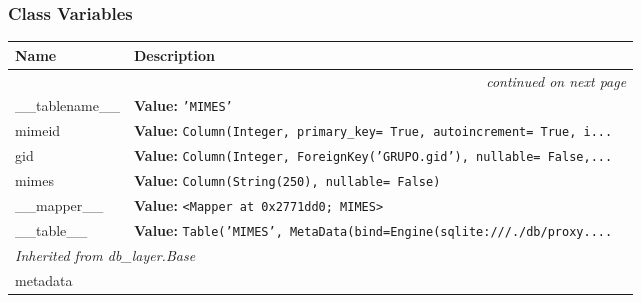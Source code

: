 
  \subsubsection{Class Variables}

    \vspace{-1cm}
\hspace{\varindent}\begin{longtable}{|p{\varnamewidth}|p{\vardescrwidth}|l}
\cline{1-2}
\cline{1-2} \centering \textbf{Name} & \centering \textbf{Description}& \\
\cline{1-2}
\endhead\cline{1-2}\multicolumn{3}{r}{\small\textit{continued on next page}}\\\endfoot\cline{1-2}
\endlastfoot\raggedright \_\-\_\-t\-a\-b\-l\-e\-n\-a\-m\-e\-\_\-\_\- & \raggedright \textbf{Value:} 
{\tt \texttt{'}\texttt{MIMES}\texttt{'}}&\\
\cline{1-2}
\raggedright m\-i\-m\-e\-i\-d\- & \raggedright \textbf{Value:} 
{\tt Column(Integer, primary\_key= True, autoincrement= True, i\texttt{...}}&\\
\cline{1-2}
\raggedright g\-i\-d\- & \raggedright \textbf{Value:} 
{\tt Column(Integer, ForeignKey('GRUPO.gid'), nullable= False,\texttt{...}}&\\
\cline{1-2}
\raggedright m\-i\-m\-e\-s\- & \raggedright \textbf{Value:} 
{\tt Column(String(250), nullable= False)}&\\
\cline{1-2}
\raggedright \_\-\_\-m\-a\-p\-p\-e\-r\-\_\-\_\- & \raggedright \textbf{Value:} 
{\tt {\textless}Mapper at 0x2771dd0; MIMES{\textgreater}}&\\
\cline{1-2}
\raggedright \_\-\_\-t\-a\-b\-l\-e\-\_\-\_\- & \raggedright \textbf{Value:} 
{\tt Table('MIMES', MetaData(bind=Engine(sqlite:///./db/proxy.\texttt{...}}&\\
\cline{1-2}
\multicolumn{2}{|l|}{\textit{Inherited from db\_layer.Base}}\\
\multicolumn{2}{|p{\varwidth}|}{\raggedright metadata}\\
\cline{1-2}
\end{longtable}

